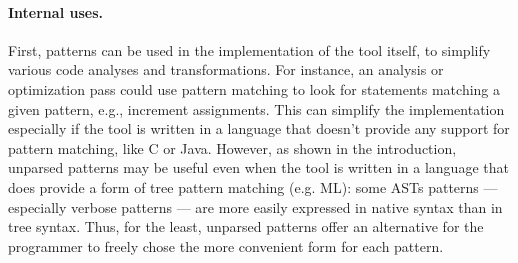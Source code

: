 \documentclass{sigplanconf}
\begin{document}
\paragraph{Internal uses.}
First, patterns can be used in the implementation of the tool itself,
to simplify various code analyses and transformations. For instance,
an analysis or optimization pass could use pattern matching to look
for statements matching a given pattern, e.g., increment assignments.
This can simplify the implementation especially if the tool is written
in a language that doesn't provide any support for pattern matching,
like C or Java. However, as shown in the introduction, unparsed
patterns may be useful even when the tool is written in a language
that does provide a form of tree pattern matching (e.g. ML): some ASTs
patterns --- especially verbose patterns --- are more easily expressed
in native syntax than in tree syntax. Thus, for the least, unparsed
patterns offer an alternative for the programmer to freely chose the
more convenient form for each pattern.



\end{document}
